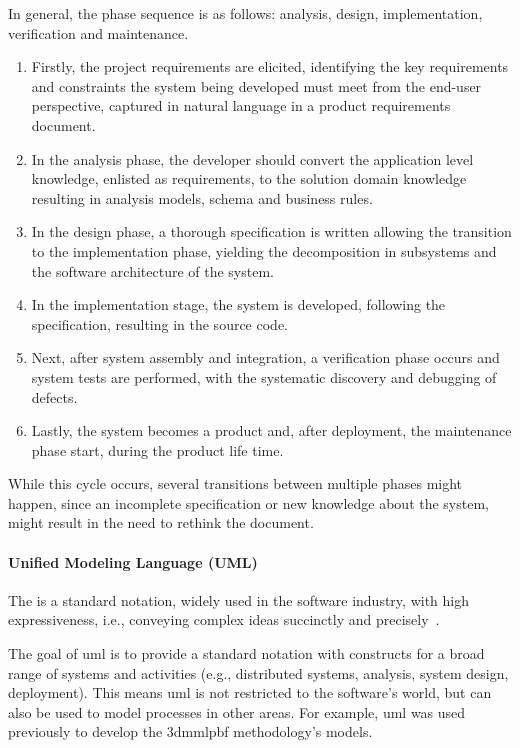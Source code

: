In general, the phase sequence is as follows: analysis, design, implementation,
verification and maintenance.
\begin{enumerate}
  \item Firstly, the project requirements are elicited, identifying the key
    requirements and constraints the system being developed must meet from the
    end-user perspective, captured in natural language in a product requirements document.
  \item In the analysis phase, the developer should convert the application
    level knowledge, enlisted as requirements, to the solution domain knowledge
    resulting in analysis models, schema and business rules.
  \item In the design phase, a thorough specification is written allowing the
    transition to the implementation phase, yielding the decomposition in
    subsystems and the software architecture of the system. 
  \item In the implementation stage, the system is developed, following the
    specification, resulting in the source code.
  \item Next, after system assembly and integration, a verification phase occurs
    and system tests are performed, with the systematic discovery and debugging
    of defects.
  \item Lastly, the system becomes a product and, after deployment, the
    maintenance phase start, during the product life time.
\end{enumerate}
While this cycle occurs, several transitions between multiple phases might
happen, since an incomplete specification or new knowledge about the system,
might result in the need to rethink the document.

\paragraph{Unified Modeling Language (UML)}
The  is a standard notation, widely used in the software industry,
with high expressiveness, i.e., conveying complex ideas succinctly and precisely~\cite{bruegge2004object}.

The goal of \gls{uml} is to provide a standard notation with 
constructs for a broad range of systems and activities (e.g., distributed
systems, analysis, system design, deployment). This means \gls{uml} is not
restricted to the software's world, but can also be used to model processes in
other areas. For example, \gls{uml} was used previously to develop the
\gls{3dmmlpbf} methodology's models.

